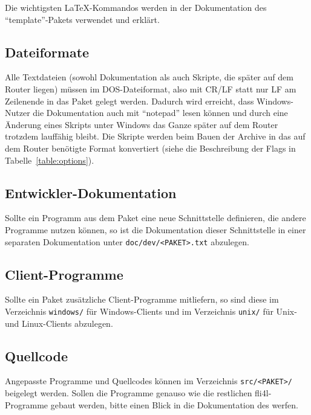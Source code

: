Die wichtigsten \LaTeX-Kommandos werden in der Dokumentation des
"`template"'-Pakets verwendet und erklärt.

\subsection{Dateiformate}

    Alle Textdateien (sowohl Dokumentation als auch Skripte, die später auf
    dem Router liegen) müssen im DOS-Dateiformat, also mit CR/LF statt nur LF
    am Zeilenende in das Paket gelegt werden. Dadurch wird erreicht, dass
    Windows-Nutzer die Dokumentation auch mit "`notepad"' lesen können und durch eine Änderung
    eines Skripts unter Windows das Ganze später auf dem Router trotzdem
    lauffähig bleibt.
    Die Skripte werden beim Bauen der Archive in das auf dem Router
    benötigte Format konvertiert (siehe die Beschreibung der Flags in Tabelle~\ref{table:options}).

\subsection{Entwickler-Dokumentation}

    Sollte ein Programm aus dem Paket eine neue Schnittstelle definieren,
    die andere Programme nutzen können, so ist die Dokumentation dieser
    Schnittstelle  in einer separaten Dokumentation unter \texttt{doc/dev/<PAKET>.txt} abzulegen.

\subsection{Client-Programme}

    Sollte ein Paket zusätzliche Client-Programme mitliefern, so sind diese
    im Verzeichnis \texttt{windows/} für Windows-Clients und im Verzeichnis \texttt{unix/} für
    Unix- und Linux-Clients abzulegen.

\subsection{Quellcode}

    Angepasste Programme und Quellcodes können im Verzeichnis \texttt{src/<PAKET>/} beigelegt
    werden. Sollen die
Programme genauso wie die restlichen fli4l-Programme gebaut werden,
bitte einen Blick in die Dokumentation des  werfen.


